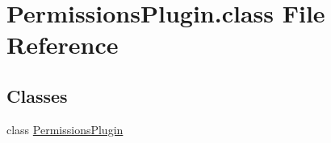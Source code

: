 \hypertarget{PermissionsPlugin_8class}{\section{Permissions\-Plugin.\-class File Reference}
\label{PermissionsPlugin_8class}
}
\subsection*{Classes}
\begin{DoxyCompactItemize}
\item 
class \hyperlink{classPermissionsPlugin}{Permissions\-Plugin}
\end{DoxyCompactItemize}
